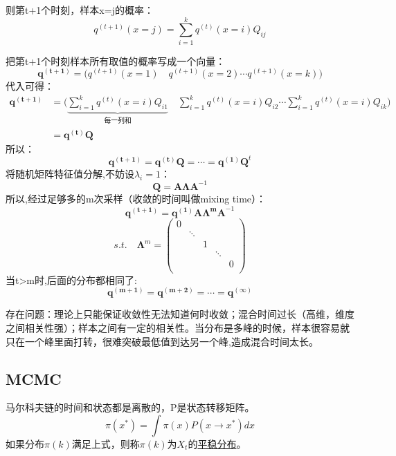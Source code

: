 \documentclass[UTF8]{ctexart} %
\begin{document}
				则第t+1个时刻，样本x=j的概率：
				\[q^{(t+1)}(x=j) = \sum_{i=1}^kq^{(t)}(x=i)Q_{ij}\]
				
				把第t+1个时刻样本所有取值的概率写成一个向量：
				\[\bm{q^{(t+1)}} = \Big(q^{(t+1)}(x=1)\quad q^{(t+1)}(x=2)\cdots q^{(t+1)}(x=k)\Big)\]
				代入可得：
				\[\begin{aligned}
				\bm{q^{(t+1)}} &= \Bigg(\underbrace{\sum_{i=1}^kq^{(t)}(x=i)Q_{i1}}_{\text{每一列和}}\quad \sum_{i=1}^kq^{(t)}(x=i)Q_{i2}\cdots \sum_{i=1}^kq^{(t)}(x=i)Q_{ik}\Bigg)\\
				&=\bm{q^{(t)}}\bm{Q}
				\end{aligned}\]
				所以：
				\[\bm{q^{(t+1)}} = \bm{q^{(t)}}\bm{Q}=\cdots=\bm{q^{(1)}}\bm{Q}^t \]
				将随机矩阵特征值分解,不妨设$\lambda_i=1$：
				\[\bm{Q} = \bm{A\Lambda A}^{-1}\]
				所以,经过足够多的m次采样（收敛的时间叫做mixing time）：
				\[\bm{q^{(t+1)}} = \bm{q^{(1)}}\bm{A\Lambda^m A}^{-1}\]
				\[s.t.\quad\bm{\Lambda}^m = \begin{pmatrix}
				0& & & & \\
				&\ddots\\
				&&1\\
				&&&\ddots\\
				&&&&0\\
				\end{pmatrix}\]
				当t>m时,后面的分布都相同了:
				\[\bm{q^{(m+1)}} = \bm{q^{(m+2)}}=\cdots=\bm{q^{(\infty)}}\]
				
				存在问题：理论上只能保证收敛性无法知道何时收敛；混合时间过长（高维，维度之间相关性强）；样本之间有一定的相关性。当分布是多峰的时候，样本很容易就只在一个峰里面打转，很难突破最低值到达另一个峰,造成混合时间太长。
				\begin{figure}[H]
				\end{figure}
			
			
			
			
			\subsection{MCMC}
				马尔科夫链的时间和状态都是离散的，P是状态转移矩阵。
				\[\pi(x^*) = \int \pi(x)P(x\rightarrow x^*)dx\]
				如果分布${\pi(k)}$满足上式，则称${\pi(k)}$为${X_t}$的\uline{平稳分布}。
				
\end{document}
